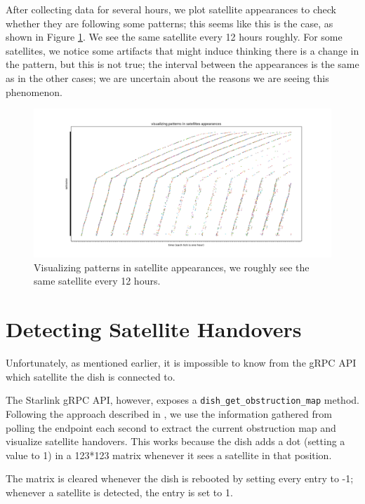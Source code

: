 \documentclass[IN,11pt,twoside,openright,idp,english]{tumthesis}
\begin{document}
After collecting data for several hours, we plot satellite appearances to check whether they are following some patterns; this seems like this is the case, as shown in Figure \ref{fig:vis-sat-pat}. We see the same satellite every 12 hours roughly. For some satellites, we notice some artifacts that might induce thinking there is a change in the pattern, but this is not true; the interval between the appearances is the same as in the other cases; we are uncertain about the reasons we are seeing this phenomenon.

\begin{figure}
    \centering
    \includegraphics[width=1.0\columnwidth]{img/visualizing-how-long-satellites-are-visible-for.png}
    \caption{Visualizing patterns in satellite appearances, we roughly see the same satellite every 12 hours.}
    \label{fig:vis-sat-pat}
\end{figure}

\section{Detecting Satellite Handovers}

Unfortunately, as mentioned earlier, it is impossible to know from the gRPC API which satellite the dish is connected to.

The Starlink gRPC API, however, exposes a \texttt{dish\_get\_obstruction\_map} method. Following the approach described in \cite{izhikevich2023democratizing}, we use the information gathered from polling the endpoint each second to extract the current obstruction map and visualize satellite handovers. This works because the dish adds a dot (setting a value to 1) in a 123*123 matrix whenever it sees a satellite in that position. 

The matrix is cleared whenever the dish is rebooted by setting every entry to -1; whenever a satellite is detected, the entry is set to 1. 
\end{document}
